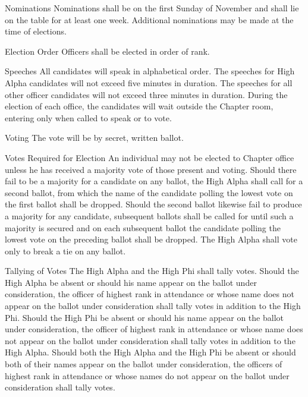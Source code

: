 \documentclass{article}
\begin{document}
\begin{subsubsectionList}
  \item {\titleStyle Nominations\titleSuffix}
  Nominations shall be on the first Sunday of November and shall lie on the
  table for at least one week. Additional nominations may be made at the time of
  elections.

  \item {\titleStyle Election Order\titleSuffix}
  Officers shall be elected in order of rank.

  \item {\titleStyle Speeches\titleSuffix}
  All candidates will speak in alphabetical order. The speeches for High Alpha
  candidates will not exceed five minutes in duration. The speeches for all
  other officer candidates will not exceed three minutes in duration. During the
  election of each office, the candidates will wait outside the Chapter room,
  entering only when called to speak or to vote.

  \item {\titleStyle Voting\titleSuffix}
  The vote will be by secret, written ballot.

  \item {\titleStyle Votes Required for Election\titleSuffix}
  An individual may not be elected to Chapter office unless he has received a
  majority vote of those present and voting. Should there fail to be a majority
  for a candidate on any ballot, the High Alpha shall call for a second ballot,
  from which the name of the candidate polling the lowest vote on the first
  ballot shall be dropped. Should the second ballot likewise fail to produce a
  majority for any candidate, subsequent ballots shall be called for until such
  a majority is secured and on each subsequent ballot the candidate polling the
  lowest vote on the preceding ballot shall be dropped. The High Alpha shall
  vote only to break a tie on any ballot.

  \item {\titleStyle Tallying of Votes\titleSuffix}
  The High Alpha and the High Phi shall tally votes. Should the High Alpha be
  absent or should his name appear on the ballot under consideration, the
  officer of highest rank in attendance or whose name does not appear on the
  ballot under consideration shall tally votes in addition to the High Phi.
  Should the High Phi be absent or should his name appear on the ballot under
  consideration, the officer of highest rank in attendance or whose name does
  not appear on the ballot under consideration shall tally votes in addition to
  the High Alpha. Should both the High Alpha and the High Phi be absent or
  should both of their names appear on the ballot under consideration, the
  officers of highest rank in attendance or whose names do not appear on the
  ballot under consideration shall tally votes.


\end{subsubsectionList}
\end{document}
